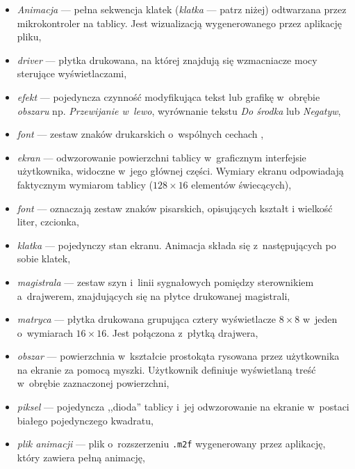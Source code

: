 \begin{itemize}
	\item \textit{Animacja} --- pełna sekwencja klatek (\textit{klatka} --- patrz niżej) odtwarzana przez mikrokontroler na tablicy. Jest wizualizacją wygenerowanego przez aplikację pliku,

	\item \textit{driver} --- płytka drukowana, na której znajdują się wzmacniacze mocy sterujące wyświetlaczami,

	\item \textit{efekt} --- pojedyncza czynność modyfikująca tekst lub grafikę w~obrębie \textit{obszaru} np. \textit{Przewijanie w~lewo}, wyrównanie tekstu \textit{Do środka} lub \textit{Negatyw},
	
	\item \textit{font} --- zestaw znaków drukarskich o~wspólnych cechach \cite{fonts},

	\item \textit{ekran} --- odwzorowanie powierzchni tablicy w~graficznym interfejsie użytkownika, widoczne w~jego głównej części. Wymiary ekranu odpowiadają faktycznym wymiarom tablicy ($128 \times 16$ elementów świecących),
	
	\item \textit{font} --- oznaczają zestaw znaków pisarskich, opisujących kształt i wielkość liter, czcionka,
	
	\item \textit{klatka} --- pojedynczy stan ekranu. Animacja składa się z~następujących po sobie klatek,

	\item \textit{magistrala} --- zestaw szyn i~linii sygnałowych pomiędzy sterownikiem a~drajwerem, znajdujących się na płytce drukowanej magistrali,

	\item \textit{matryca} --- płytka drukowana grupująca cztery wyświetlacze $8 \times 8 $ w~jeden o~wymiarach $16 \times 16$. Jest połączona z~płytką drajwera,

	\item \textit{obszar} --- powierzchnia w~kształcie prostokąta rysowana przez użytkownika na ekranie za pomocą myszki. Użytkownik definiuje wyświetlaną treść w~obrębie zaznaczonej powierzchni,

	\item \textit{piksel} --- pojedyncza ,,dioda'' tablicy i~jej odwzorowanie na ekranie w~postaci białego pojedynczego kwadratu,

	\item \textit{plik animacji} --- plik o~rozszerzeniu \texttt{.m2f} wygenerowany przez aplikację, który zawiera pełną animację,


\end{itemize}
